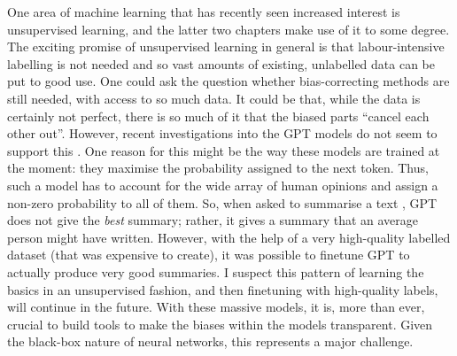 One area of machine learning that has recently seen increased interest is unsupervised learning,
and the latter two chapters make use of it to some degree. The exciting promise of unsupervised
learning in general is that labour-intensive labelling is not needed and so vast amounts of
existing, unlabelled data can be put to good use. One could ask the question whether
bias-correcting methods are still needed, with access to so much data. It could be that, while the
data is certainly not perfect, there is so much of it that the biased parts ``cancel each other
out''. However, recent investigations into the GPT models
\citep{radford2018improving,radford2019language,brown2020language} do not seem to support this
\citep{khalifa2021distributional}. One reason for this might be the way these models are trained at
the moment: they maximise the probability assigned to the next token. Thus, such a model has to
account for the wide array of human opinions and assign a non-zero probability to all of them. So,
when asked to summarise a text \citep{stiennon2020learning}, GPT does not give the \emph{best}
summary; rather, it gives a summary that an average person might have written. However, with the
help of a very high-quality labelled dataset (that was expensive to create), it was possible to
finetune GPT to actually produce very good summaries. I suspect this pattern of learning the basics
in an unsupervised fashion, and then finetuning with high-quality labels, will continue in the
future. With these massive models, it is, more than ever, crucial to build tools to make the biases
within the models transparent. Given the black-box nature of neural networks, this represents a
major challenge.

